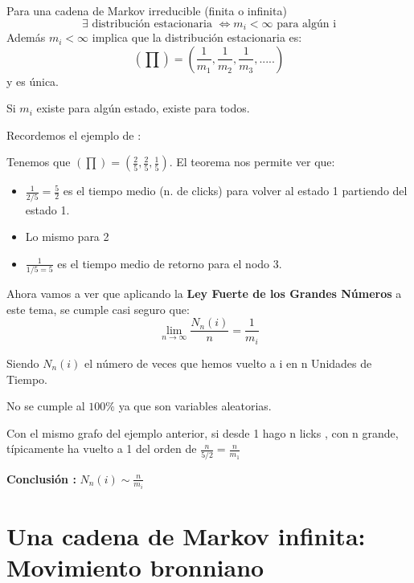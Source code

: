 	\begin{theorem}[Teorema 4]
		\label{Markov_tma4}
		Para una cadena de Markov irreducible (finita o infinita)
		$$\exists \text{ distribución estacionaria } \iff m_i <\infty \text{ para algún i}$$
		Además $m_i<\infty$ implica que la distribución estacionaria es:
		$$(\prod) = (\frac{1}{m_1}, \frac{1}{m_2},\frac{1}{m_3}, .....)$$
		y es única.
	\end{theorem}
	\obs Si $m_i$ existe para algún estado, existe para todos.
	
	\begin{example}
		Recordemos el ejemplo de :
			\begin{center}
				\centering
			\end{center}
		
		Tenemos que $(\prod) = (\frac{2}{5}, \frac{2}{5}, \frac{1}{5})$. El teorema nos permite ver que:
		\begin{itemize}
			\item $\frac{1}{2/5} = \frac{5}{2}$ es el tiempo medio (n. de clicks) para volver al estado 1 partiendo del estado 1.
			\item Lo mismo para 2
			\item $\frac{1}{1/5 = 5}$ es el tiempo medio de retorno para el nodo 3.
		\end{itemize}
	\end{example}
	
	Ahora vamos a ver que aplicando la \textbf{Ley Fuerte de los Grandes Números} a este tema, se cumple casi seguro que:
	$$\lim_{n \rightarrow \infty} \frac{N_n (i)}{n} = \frac{1}{m_i}$$
	
	Siendo $N_n (i)$ el número de veces que hemos vuelto a i en n Unidades de Tiempo.
	
	\obs No se cumple al $100\%$ ya que son variables aleatorias.
	
	\begin{example}
		Con el mismo grafo del ejemplo anterior, si desde 1 hago n licks , con n grande, típicamente ha vuelto a 1 del orden de $\frac{n}{5/2} = \frac{n}{m_1}$
	\end{example}
	
	\textbf{Conclusión :} $N_n (i) \sim \frac{n}{m_i}$




\section{Una cadena de Markov infinita: Movimiento bronniano}

